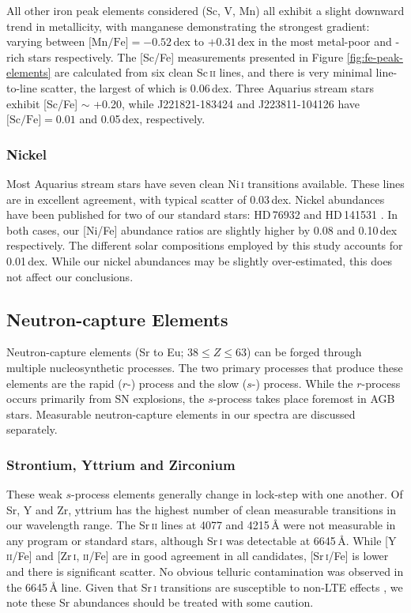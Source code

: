 \documentclass{emulateapj}
\begin{document}
All other iron peak elements considered (Sc, V, Mn) all exhibit a slight downward trend in metallicity, with manganese demonstrating the strongest gradient: varying between {$\mbox{[Mn/Fe]} = -0.52$\,dex} to {$+0.31$\,dex} in the most metal-poor and -rich stars respectively. The [Sc/Fe] measurements presented in Figure \ref{fig:fe-peak-elements} are calculated from six clean {Sc\,\textsc{ii}} lines, and there is very minimal line-to-line scatter, the largest of which is {0.06\,dex}. Three Aquarius stream stars exhibit {[Sc/Fe] $\sim$ +0.20}, while {J221821-183424} and {J223811-104126} have ${\mbox{[Sc/Fe]} = 0.01}$ and {0.05\,dex}, respectively. \\



\subsubsection{Nickel}
Most Aquarius stream stars have seven clean {Ni\,\textsc{i}} transitions available. These lines are in excellent agreement, with typical scatter of {0.03\,dex}. Nickel abundances have been published for two of our standard stars: HD\,76932 \citep{fulbright_2000} and HD\,141531 \citep{shetrone_1996}. In both cases, our [Ni/Fe] abundance ratios are slightly higher by 0.08 and 0.10\,dex respectively. The different solar compositions employed by this study accounts for 0.01\,dex. While our nickel abundances may be slightly over-estimated, this does not affect our conclusions. 

\subsection{Neutron-capture Elements}
Neutron-capture elements (Sr to Eu; ${38 \leqslant Z \leqslant 63}$) can be forged through multiple nucleosynthetic processes. The two primary processes that produce these elements are the rapid ($r$-) process and the slow ($s$-) process. While the $r$-process occurs primarily from SN explosions, the $s$-process takes place foremost in AGB stars. Measurable neutron-capture elements in our spectra are discussed separately.

\subsubsection{Strontium, Yttrium and Zirconium}
\label{sec:weak-s-process-elements}

These weak $s$-process elements generally change in lock-step with one another. Of Sr, Y and Zr, yttrium has the highest number of clean measurable transitions in our wavelength range. The {Sr\,\textsc{ii}} lines at 4077 and {4215\,\AA} were not measurable in any program or standard stars, although {Sr\,\textsc{i}} was detectable at {6645\,\AA}. While {[Y\,\textsc{ii}/Fe]} and {[Zr\,\textsc{i}, \textsc{ii}/Fe]} are in good agreement in all candidates, {[Sr\,\textsc{i}/Fe]} is lower and there is significant scatter. No obvious telluric contamination was observed in the 6645\,{\AA} line. Given that Sr\,\textsc{i} transitions are susceptible to non-LTE effects \citep{hansen;et-al_2013}, we note these Sr abundances should be treated with some caution.
\end{document}

